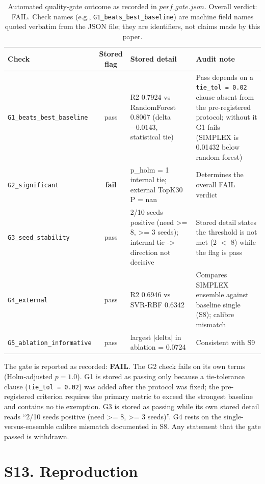 \documentclass[utf8]{frontiers_suppmat}
\begin{document}
\begin{table}[h]
\centering
\caption{Automated quality-gate outcome as recorded in $perf\_gate.json$. Overall verdict: FAIL. Check names (e.g., \texttt{G1\_beats\_best\_baseline}) are machine field names quoted verbatim from the JSON file; they are identifiers, not claims made by this paper.}
\label{tab:S12}
\begin{tabular}{p{4.2cm}cp{4.6cm}p{4.6cm}}
\toprule
Check & Stored flag & Stored detail & Audit note \\
\midrule
\texttt{G1\_beats\_best\_baseline} & pass & R2 0.7924 vs RandomForest 0.8067 (delta $-0.0143$, statistical tie) & Pass depends on a \texttt{tie\_tol = 0.02} clause absent from the pre-registered protocol; without it G1 fails (SIMPLEX is 0.01432 below random forest) \\
\texttt{G2\_significant} & \textbf{fail} & p\_holm = 1 internal tie; external TopK30 P = nan & Determines the overall FAIL verdict \\
\texttt{G3\_seed\_stability} & pass & 2/10 seeds positive (need >= 8, >= 3 seeds); internal tie -> direction not decisive & Stored detail states the threshold is not met (2 $<$ 8) while the flag is pass \\
\texttt{G4\_external} & pass & R2 0.6946 vs SVR-RBF 0.6342 & Compares SIMPLEX ensemble against baseline single (S8); calibre mismatch \\
\texttt{G5\_ablation\_informative} & pass & largest $|\text{delta}|$ in ablation = 0.0724 & Consistent with S9 \\
\bottomrule
\end{tabular}
\end{table}

The gate is reported as recorded: \textbf{FAIL}. The G2 check fails on its own terms (Holm-adjusted $p = 1.0$). G1 is stored as passing only because a tie-tolerance clause (\texttt{tie\_tol = 0.02}) was added after the protocol was fixed; the pre-registered criterion requires the primary metric to exceed the strongest baseline and contains no tie exemption. G3 is stored as passing while its own stored detail reads ``2/10 seeds positive (need >= 8, >= 3 seeds)''. G4 rests on the single-versus-ensemble calibre mismatch documented in S8. Any statement that the gate passed is withdrawn.

\section{S13. Reproduction}
\end{document}
